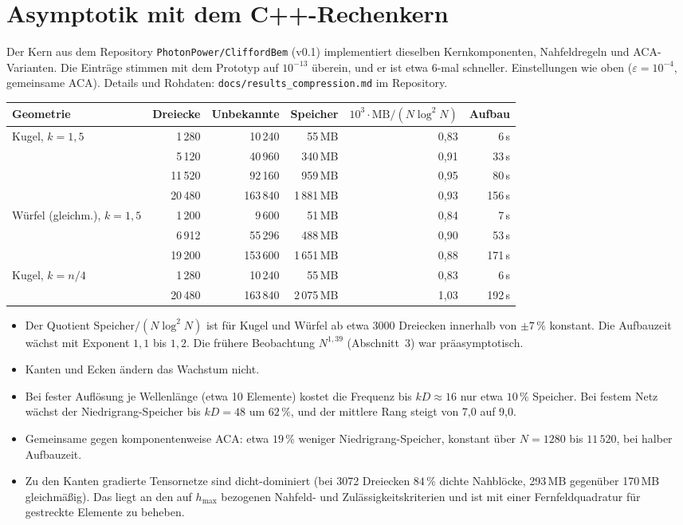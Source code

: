 \documentclass[11pt, a4paper]{article}
\begin{document}
\section{Asymptotik mit dem C++-Rechenkern}\label{sec:cpp}
Der Kern aus dem Repository \texttt{PhotonPower/CliffordBem} (v0.1) implementiert dieselben
Kernkomponenten, Nahfeldregeln und ACA-Varianten. Die Einträge stimmen mit dem Prototyp auf
$10^{-13}$ überein, und er ist etwa 6-mal schneller. Einstellungen wie oben ($\varepsilon=10^{-4}$,
gemeinsame ACA). Details und Rohdaten: \texttt{docs/results\_compression.md} im Repository.
\begin{center}\small
\begin{tabular}{lrrrrr}
\toprule
Geometrie & Dreiecke & Unbekannte & Speicher & $10^3\cdot\mathrm{MB}/(N\log^2N)$ & Aufbau\\
\midrule
Kugel, $k=1{,}5$ & 1\,280 & 10\,240 & 55\,MB & 0,83 & 6\,s\\
 & 5\,120 & 40\,960 & 340\,MB & 0,91 & 33\,s\\
 & 11\,520 & 92\,160 & 959\,MB & 0,95 & 80\,s\\
 & 20\,480 & 163\,840 & 1\,881\,MB & 0,93 & 156\,s\\
Würfel (gleichm.), $k=1{,}5$ & 1\,200 & 9\,600 & 51\,MB & 0,84 & 7\,s\\
 & 6\,912 & 55\,296 & 488\,MB & 0,90 & 53\,s\\
 & 19\,200 & 153\,600 & 1\,651\,MB & 0,88 & 171\,s\\
Kugel, $k=n/4$ & 1\,280 & 10\,240 & 55\,MB & 0,83 & 6\,s\\
 & 20\,480 & 163\,840 & 2\,075\,MB & 1,03 & 192\,s\\
\bottomrule
\end{tabular}
\end{center}
\begin{itemize}[leftmargin=*]
  \item Der Quotient Speicher$/(N\log^2N)$ ist für Kugel und Würfel ab etwa 3000 Dreiecken
    innerhalb von $\pm7\,\%$ konstant. Die Aufbauzeit wächst mit Exponent $1{,}1$ bis
    $1{,}2$. Die frühere Beobachtung $N^{1{,}39}$ (Abschnitt~3) war präasymptotisch.
  \item Kanten und Ecken ändern das Wachstum nicht.
  \item Bei fester Auflösung je Wellenlänge (etwa 10 Elemente) kostet die Frequenz bis
    $kD\approx16$ nur etwa $10\,\%$ Speicher. Bei festem Netz wächst der Niedrigrang-Speicher
    bis $kD=48$ um $62\,\%$, und der mittlere Rang steigt von 7,0 auf 9,0.
  \item Gemeinsame gegen komponentenweise ACA: etwa $19\,\%$ weniger
    Niedrigrang-Speicher, konstant über $N=1280$ bis $11\,520$, bei halber Aufbauzeit.
  \item Zu den Kanten gradierte Tensornetze sind dicht-dominiert (bei 3072 Dreiecken $84\,\%$
    dichte Nahblöcke, 293\,MB gegenüber 170\,MB gleichmäßig). Das liegt an den auf $h_{\max}$
    bezogenen Nahfeld- und Zulässigkeitskriterien und ist mit einer Fernfeldquadratur für
    gestreckte Elemente zu beheben.
\end{itemize}
\end{document}
